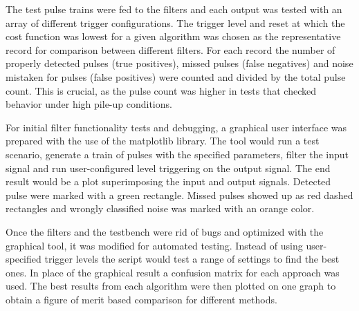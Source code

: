 The test pulse trains were fed to the filters and each output was 
tested with an array of different trigger configurations.
The trigger level and reset at which the cost function was lowest for 
a given algorithm was chosen as the representative record for comparison
between different filters.
For each record the number of properly detected pulses (true positives),
missed pulses (false negatives) and noise mistaken for pulses (false positives) 
were counted and divided by the total pulse count.
This is crucial, as the pulse count was higher in tests that checked 
behavior under high pile-up conditions.


For initial filter functionality tests and debugging, a graphical user interface
was prepared with the use of the matplotlib library.
The tool would run a test scenario, generate a train of pulses with 
the specified parameters, filter the input signal and run
user-configured level triggering on the output signal.
The end result would be a plot superimposing the input and output signals.
Detected pulse were marked with a green rectangle. Missed pulses
showed up as red dashed rectangles and wrongly classified noise
was marked with an orange color.


Once the filters and the testbench were rid of bugs and optimized 
with the graphical tool, it was modified for automated testing.
Instead of using user-specified trigger levels the script would 
test a range of settings to find the best ones. In place of the graphical
result a confusion matrix for each approach was used.
The best results from each algorithm were then plotted on
one graph to obtain a figure of merit based comparison for 
different methods.
